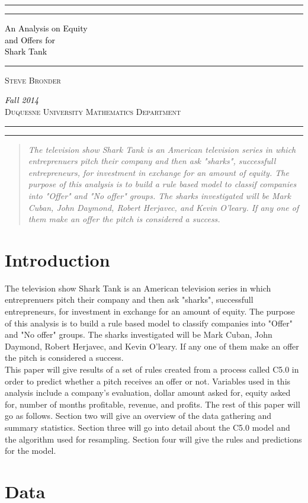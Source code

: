\documentclass[11pt]{article}\usepackage[]{graphicx}\usepackage[]{color}
\newcommand*{\titleAT}{\begingroup %
\newlength{\drop} %
\drop=0.1\textheight %

\rule{\textwidth}{1pt}\par %
\vspace{2pt}\vspace{-\baselineskip} %
\rule{\textwidth}{0.4pt}\par %

\vspace{\drop} %
\centering %
\textcolor{black}{ %
{\Huge An Analysis on Equity}\\[0.5\baselineskip] %
{\Huge and Offers for }\\[0.5\baselineskip] %
{\Huge Shark Tank}} %

\vspace{0.25\drop} %
\rule{0.3\textwidth}{0.4pt}\par %
\vspace{\drop} %

{\Large \textsc{Steve Bronder}}\par %

\vfill %
{\large \textcolor{black}{\textit{Fall 2014}}}\\[0.5\baselineskip] %
{\large \textsc{Duquesne University Mathematics Department}}\par %

\vspace*{\drop} %

\rule{\textwidth}{0.4pt}\par %
\vspace{2pt}\vspace{-\baselineskip} %
\rule{\textwidth}{1pt}\par %

\endgroup}
\begin{document}
\titleAT
\clearpage
\newpage
{}
\setcounter{page}{1}

\begin{abstract}
\emph{The television show Shark Tank is an American television series in which entreprenuers pitch their company and then ask "sharks", successfull entrepreneurs, for investment in exchange for an amount of equity. The purpose of this analysis is to build a rule based model to classif companies into "Offer" and "No offer" groups. The sharks investigated will be Mark Cuban, John Daymond, Robert Herjavec, and Kevin O'leary. If any one of them make an offer the pitch is considered a success.
}
 
\end{abstract}
\newpage
\section{Introduction}
The television show Shark Tank is an American television series in which entreprenuers pitch their company and then ask "sharks", successfull entrepreneurs, for investment in exchange for an amount of equity. The purpose of this analysis is to build a rule based model to classify companies into "Offer" and "No offer" groups. The sharks investigated will be Mark Cuban, John Daymond, Robert Herjavec, and Kevin O'leary. If any one of them make an offer the pitch is considered a success.\\

This paper will give results of a set of rules created from a process called C5.0 in order to predict whether a pitch receives an offer or not. Variables used in this analysis include a company's evaluation, dollar amount asked for, equity asked for, number of months profitable, revenue, and profits. The rest of this paper will go as follows. Section two will give an overview of the data gathering and summary statistics. Section three will go into detail about the C5.0 model and the algorithm used for resampling. Section four will give the rules and predictions for the model.



\section{Data}
\end{document}

